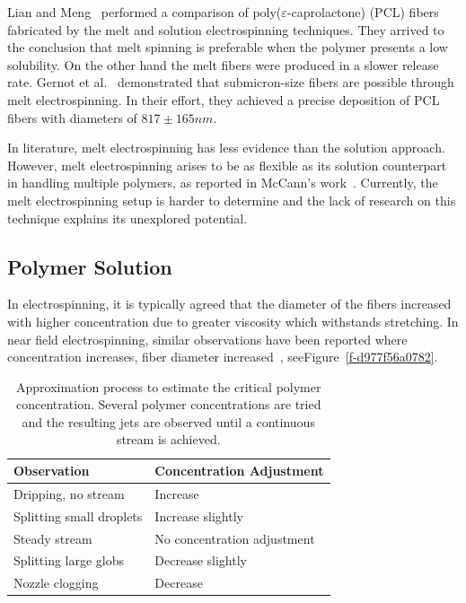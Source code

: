 Lian and Meng\unskip~\cite{527120:13445754} performed a comparison of poly(\ensuremath{\varepsilon }-caprolactone) (PCL) fibers fabricated by the melt and solution electrospinning techniques. They arrived to the conclusion that melt spinning is preferable when the polymer presents a low solubility. On the other hand the melt fibers were produced in a slower release rate. Gernot et al.\unskip~\cite{527120:13534159} demonstrated that submicron-size fibers are possible through melt electrospinning. In their effort, they achieved a precise deposition of PCL fibers with diameters of $817 \pm 165 nm $. 

In literature, melt electrospinning has less evidence than the solution approach. However, melt electrospinning arises to be as flexible as its solution counterpart in handling multiple polymers, as reported in McCann's work\unskip~\cite{527120:13534572}. Currently, the melt electrospinning setup is harder to determine and the lack of research on this technique explains its unexplored potential.



\subsection{Polymer Solution}In electrospinning, it is typically agreed that the diameter of the fibers increased with higher concentration due to greater viscosity which withstands stretching. In near field electrospinning, similar observations have been reported where concentration increases, fiber diameter increased\unskip~\cite{527120:11974306,527120:11974329}, seeFigure~\ref{f-d977f56a0782}.
\begin{table}[!htbp]
\caption{{Approximation process to estimate the critical polymer concentration. Several polymer concentrations are tried and the resulting jets are observed until a continuous stream is achieved.} }
\label{tw-be3662f66502}
\def\arraystretch{1}
\ignorespaces 
\centering 
\begin{tabularx}{\textwidth}{ll}
\hline Observation & Concentration Adjustment\\
\hline 
Dripping, no stream &
  Increase\\
Splitting small droplets &
  Increase slightly\\
Steady stream &
  No concentration adjustment\\
Splitting large globs &
  Decrease slightly\\
Nozzle clogging &
  Decrease\\
\hline 
\end{tabularx}\par 
\end{table}




